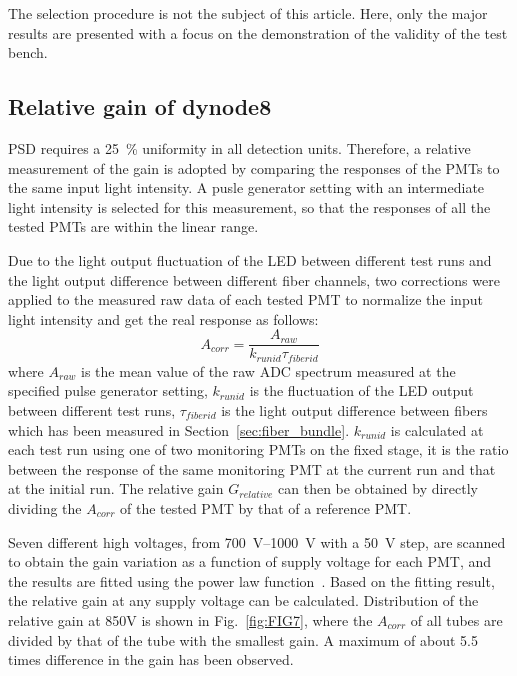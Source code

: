 \documentclass{nst}
\begin{document}
The selection procedure is not the subject of this article.
Here, only the major results are presented with a focus on the demonstration of the validity of the test bench. 

\subsection{Relative gain of dynode8}
\label{sec:psd_gain}

PSD requires a \SI{25}{\percent} uniformity in all detection units. 
Therefore, a relative measurement of the gain is adopted by comparing the responses of the PMTs to the same input light intensity.
A pusle generator setting with an intermediate light intensity is selected for this measurement, so that the responses of all the tested PMTs are within the linear range.


Due to the light output fluctuation of the LED between different test runs and the light output difference between different fiber channels, two corrections were applied to the measured raw data of each tested PMT to normalize the input light intensity and get the real response as follows: 
\begin{equation}
	A_{corr} = \frac{A_{raw}}{k_{runid}\tau_{fiberid}}
\end{equation} 
where $A_{raw}$ is the mean value of the raw ADC spectrum measured at the specified pulse generator setting,
$k_{runid}$ is the fluctuation of the LED output between different test runs,
$\tau_{fiberid}$ is the light output difference between fibers which has been measured in Section~\ref{sec:fiber_bundle}.
$k_{runid}$ is calculated at each test run using one of two monitoring PMTs on the fixed stage, it is the ratio between the response of the same monitoring PMT at the current run and that at the initial run.
The relative gain $G_{relative}$ can then be obtained by directly dividing the $A_{corr}$ of the tested PMT by that of a reference PMT.

Seven different high voltages, from \SIrange{700}{1000}{\volt} with a \SI{50}{\volt} step, are scanned to obtain the gain variation as a function of supply voltage for each PMT, and the results are fitted using the power law function~\cite{hamamatsu}.
Based on the fitting result, the relative gain at any supply voltage can be calculated.
Distribution of the relative gain at 850V is shown in Fig.~\ref{fig:FIG7}, where the $A_{corr}$ of all tubes are divided by that of the tube with the smallest gain. 
A maximum of about 5.5 times difference in the gain has been observed.
\end{document}
